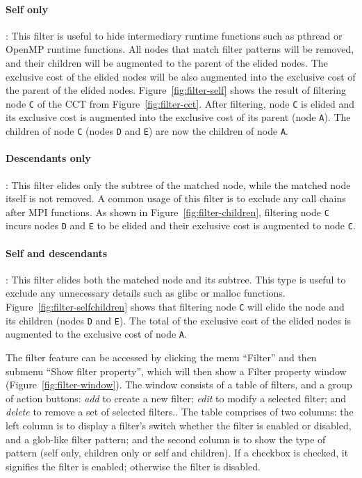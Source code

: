 \paragraph{Self only}: This filter is useful to hide intermediary runtime functions such as pthread or OpenMP runtime functions.
All nodes that match filter patterns will be removed, and their children will be augmented to the parent of the elided nodes.
The exclusive cost of the elided nodes will be also augmented into the exclusive cost of the parent of the elided nodes.
Figure~\ref{fig:filter-self} shows the result of filtering node \texttt{C} of the CCT from Figure~\ref{fig:filter-cct}.
After filtering, node \texttt{C} is elided and its exclusive cost is augmented into the exclusive cost of its parent (node \texttt{A}).
The children of node \texttt{C} (nodes \texttt{D} and \texttt{E}) are now the children of node \texttt{A}.

\paragraph{Descendants only}: This filter elides only the subtree of the matched node, while the matched node itself is not removed.
A common usage of this filter is to exclude any call chains after MPI functions.
As shown in Figure~\ref{fig:filter-children}, filtering node \texttt{C} incurs nodes \texttt{D} and \texttt{E} to be elided and their exclusive cost is augmented to node \texttt{C}.

\paragraph{Self and descendants}: This filter elides both the matched node and its subtree.
This type is useful to exclude any unnecessary details such as glibc or malloc functions.
Figure~\ref{fig:filter-selfchildren} shows that filtering node \texttt{C} will elide the node and its children (nodes \texttt{D} and \texttt{E}).
The total of the exclusive cost of the elided nodes is augmented to the exclusive cost of node \texttt{A}.

The filter feature can be accessed by clicking the menu ``Filter'' and then submenu ``Show filter property'', which will then show a  Filter property window (Figure~\ref{fig:filter-window}).
The window consists of a table of filters, and a group of action buttons: \emph{add} to create a new filter; \emph{edit} to modify a selected filter; and \emph{delete} to remove a set of selected filters..
The table comprises of two columns: the left column is to display a filter's switch whether the filter is enabled or disabled, and a glob-like filter pattern; and the second column is to show the type of pattern (self only, children only or self and children).
If a checkbox is checked, it signifies the filter is enabled; otherwise the filter is disabled.

